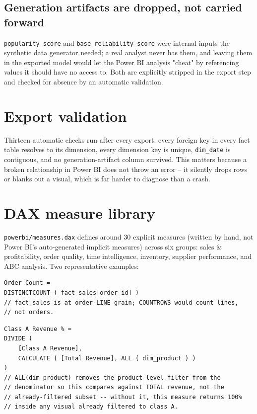 \documentclass[11pt,a4paper]{report}
\begin{document}
\subsection*{Generation artifacts are dropped, not carried forward}
\texttt{popularity\_score} and \texttt{base\_reliability\_score} were
internal inputs the synthetic data generator needed; a real analyst never
has them, and leaving them in the exported model would let the Power BI
analysis "cheat" by referencing values it should have no access to. Both
are explicitly stripped in the export step and checked for absence by an
automatic validation.

\section{Export validation}

Thirteen automatic checks run after every export: every foreign key in
every fact table resolves to its dimension, every dimension key is unique,
\texttt{dim\_date} is contiguous, and no generation-artifact column
survived. This matters because a broken relationship in Power BI does not
throw an error -- it silently drops rows or blanks out a visual, which is
far harder to diagnose than a crash.

\section{DAX measure library}

\texttt{powerbi/measures.dax} defines around 30 explicit measures (written
by hand, not Power BI's auto-generated implicit measures) across six
groups: sales \& profitability, order quality, time intelligence,
inventory, supplier performance, and ABC analysis. Two representative
examples:

\begin{lstlisting}[language=DAX, caption=Order count at the correct grain]
Order Count =
DISTINCTCOUNT ( fact_sales[order_id] )
// fact_sales is at order-LINE grain; COUNTROWS would count lines,
// not orders.
\end{lstlisting}

\begin{lstlisting}[language=DAX, caption=A measure that must not return 100\% inside its own filter]
Class A Revenue % =
DIVIDE (
    [Class A Revenue],
    CALCULATE ( [Total Revenue], ALL ( dim_product ) )
)
// ALL(dim_product) removes the product-level filter from the
// denominator so this compares against TOTAL revenue, not the
// already-filtered subset -- without it, this measure returns 100%
// inside any visual already filtered to class A.
\end{lstlisting}
\end{document}
